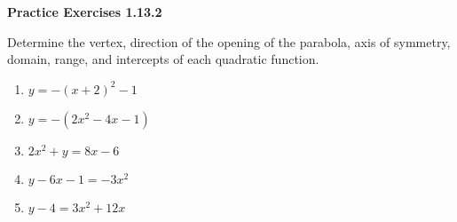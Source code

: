 \noindent\textbf{Practice Exercises 1.13.2}


Determine the vertex, direction of the opening of the parabola, axis of symmetry, domain, range, and intercepts of each quadratic function. 
\begin{multicols}{2}
\begin{enumerate}[label = \color{blue}\arabic*. ]
\item $ y = -(x+2)^{2} - 1 $
\item $ y = -(2x^{2} - 4x - 1) $
\item $ 2x^{2} + y = 8x - 6 $
\item $ y - 6x - 1 = -3x^{2} $
\item $ y - 4 = 3x^{2} + 12x $
\end{enumerate}
\end{multicols} 

